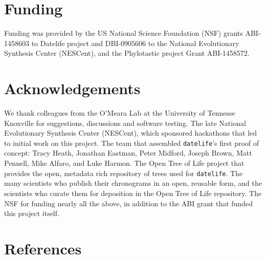 \documentclass[
  english,
  man]{apa6}
\begin{document}
\hypertarget{funding}{%
\section{Funding}\label{funding}}

Funding was provided by the US National Science Foundation (NSF) grants ABI-1458603 to Datelife project and DBI-0905606 to the National Evolutionary Synthesis Center (NESCent), and the Phylotastic project Grant ABI-1458572.

\hypertarget{acknowledgements}{%
\section{Acknowledgements}\label{acknowledgements}}

We thank colleagues from the O'Meara Lab at the University
of Tennesse Knoxville for suggestions, discussions and software testing.
The late National Evolutionary Synthesis Center (NESCent), which sponsored hackathons
that led to initial work on this project. The team that assembled \texttt{datelife}'s first proof of concept: Tracy Heath, Jonathan Eastman, Peter Midford, Joseph Brown, Matt Pennell, Mike Alfaro, and Luke Harmon.
The Open Tree of Life project that provides the open, metadata rich repository of
trees used for \texttt{datelife}.
The many scientists who publish their chronograms in an open, reusable form, and
the scientists who curate them for deposition in the Open Tree of Life repository.
The NSF for funding nearly all the above, in addition to the ABI grant that funded this project itself.

\newpage

\hypertarget{references}{%
\section{References}\label{references}}

\begingroup
\setlength{\parindent}{-0.5in}
\setlength{\leftskip}{0.5in}
\end{document}
